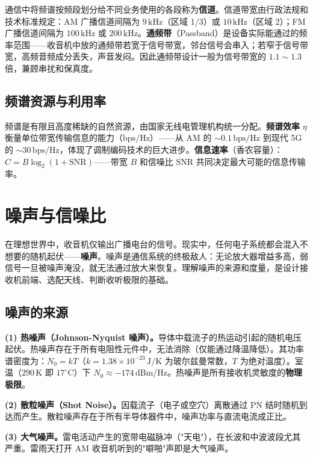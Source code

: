 \documentclass[12pt,UTF8]{ctexbook}
\begin{document}
通信中将频谱按频段划分给不同业务使用的各段称为\textbf{信道}。信道带宽由行政法规和技术标准规定：AM 广播信道间隔为 $9\,\mathrm{kHz}$（区域 1/3）或 $10\,\mathrm{kHz}$（区域 2）；FM 广播信道间隔为 $100\,\mathrm{kHz}$ 或 $200\,\mathrm{kHz}$。\textbf{通频带}（Passband）是设备实际能通过的频率范围——收音机中放的通频带若宽于信号带宽，邻台信号会串入；若窄于信号带宽，高频音频成分丢失，声音发闷。因此通频带设计一般为信号带宽的 $1.1\sim1.3$ 倍，兼顾串扰和保真度。

\subsection{频谱资源与利用率}

频谱是有限且高度稀缺的自然资源，由国家无线电管理机构统一分配。\textbf{频谱效率} $\eta$ 衡量单位带宽传输信息的能力（$\mathrm{bps/Hz}$）——从 AM 的 $\sim0.1\,\mathrm{bps/Hz}$ 到现代 5G 的 $\sim30\,\mathrm{bps/Hz}$，体现了调制编码技术的巨大进步。\textbf{信息速率}（香农容量）：$C = B\log_2(1+\mathrm{SNR})$——带宽 $B$ 和信噪比 SNR 共同决定最大可能的信息传输率。

\section{噪声与信噪比}
\label{sec:noise_snr}

在理想世界中，收音机仅输出广播电台的信号。现实中，任何电子系统都会混入不想要的随机起伏——\textbf{噪声}。噪声是通信系统的终极敌人：无论放大器增益多高，弱信号一旦被噪声淹没，就无法通过放大来恢复。理解噪声的来源和度量，是设计接收机前端、选配天线、判断收听极限的基础。

\subsection{噪声的来源}

\textbf{(1) 热噪声（Johnson-Nyquist 噪声）。}导体中载流子的热运动引起的随机电压起伏。热噪声存在于所有电阻性元件中，无法消除（仅能通过降温降低）。其功率谱密度为：$N_0 = kT$（$k = 1.38\times10^{-23}\,\mathrm{J/K}$ 为玻尔兹曼常数，$T$ 为绝对温度）。室温（$290\,\mathrm{K}$ 即 $17^\circ\mathrm{C}$）下 $N_0 \approx -174\,\mathrm{dBm/Hz}$。热噪声是所有接收机灵敏度的\textbf{物理极限}。

\textbf{(2) 散粒噪声（Shot Noise）。}因载流子（电子或空穴）离散通过 PN 结时随机到达而产生。散粒噪声存在于所有半导体器件中，噪声功率与直流电流成正比。

\textbf{(3) 大气噪声。}雷电活动产生的宽带电磁脉冲（"天电"），在长波和中波波段尤其严重。雷雨天打开 AM 收音机听到的"噼啪"声即是大气噪声。
\end{document}
